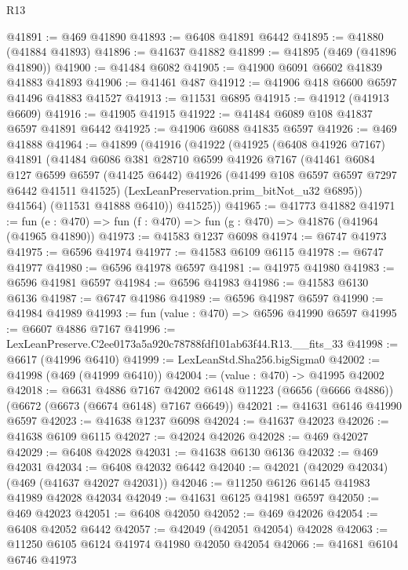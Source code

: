 \begin{lexlean}{R13}
\begin{coremodule}
@41891 := @469 @41890
@41893 := @6408 @41891 @6442
@41895 := @41880 (@41884 @41893)
@41896 := @41637 @41882
@41899 := @41895 (@469 (@41896 @41890))
@41900 := @41484 @6082
@41905 := @41900 @6091 @6602 @41839 @41883 @41893
@41906 := @41461 @487
@41912 := @41906 @418 @6600 @6597 @41496 @41883 @41527
@41913 := @11531 @6895
@41915 := @41912 (@41913 @6609)
@41916 := @41905 @41915
@41922 := @41484 @6089 @108 @41837 @6597 @41891 @6442
@41925 := @41906 @6088 @41835 @6597
@41926 := @469 @41888
@41964 := @41899
    (@41916
      (@41922
        (@41925
          (@6408 @41926 @7167)
          @41891
          (@41484
            @6086
            @381
            @28710
            @6599
            @41926
            @7167
            (@41461
              @6084
              @127
              @6599
              @6597
              (@41425 @6442)
              @41926
              (@41499 @108 @6597 @6597 @7297 @6442 @41511 @41525)
              (LexLeanPreservation.prim_bitNot_u32 @6895))
            @41564)
          (@11531 @41888 @6410))
        @41525))
@41965 := @41773 @41882
@41971 := fun (e : @470) => fun (f : @470) => fun (g : @470) => @41876 (@41964 (@41965 @41890))
@41973 := @41583 @1237 @6098
@41974 := @6747 @41973
@41975 := @6596 @41974
@41977 := @41583 @6109 @6115
@41978 := @6747 @41977
@41980 := @6596 @41978 @6597
@41981 := @41975 @41980
@41983 := @6596 @41981 @6597
@41984 := @6596 @41983
@41986 := @41583 @6130 @6136
@41987 := @6747 @41986
@41989 := @6596 @41987 @6597
@41990 := @41984 @41989
@41993 := fun (value : @470) => @6596 @41990 @6597
@41995 := @6607 @4886 @7167
@41996 := LexLeanPreserve.C2ee0173a5a920c78788fdf101ab63f44.R13.__fits_33
@41998 := @6617 (@41996 @6410)
@41999 := LexLeanStd.Sha256.bigSigma0
@42002 := @41998 (@469 (@41999 @6410))
@42004 := (value : @470) -> @41995 @42002
@42018 := @6631
    @4886
    @7167
    @42002
    @6148
    @11223
    (@6656 (@6666 @4886))
    (@6672 (@6673 (@6674 @6148) @7167 @6649))
@42021 := @41631 @6146 @41990 @6597
@42023 := @41638 @1237 @6098
@42024 := @41637 @42023
@42026 := @41638 @6109 @6115
@42027 := @42024 @42026
@42028 := @469 @42027
@42029 := @6408 @42028
@42031 := @41638 @6130 @6136
@42032 := @469 @42031
@42034 := @6408 @42032 @6442
@42040 := @42021 (@42029 @42034) (@469 (@41637 @42027 @42031))
@42046 := @11250 @6126 @6145 @41983 @41989 @42028 @42034
@42049 := @41631 @6125 @41981 @6597
@42050 := @469 @42023
@42051 := @6408 @42050
@42052 := @469 @42026
@42054 := @6408 @42052 @6442
@42057 := @42049 (@42051 @42054) @42028
@42063 := @11250 @6105 @6124 @41974 @41980 @42050 @42054
@42066 := @41681 @6104 @6746 @41973

\end{coremodule}
\end{lexlean}
